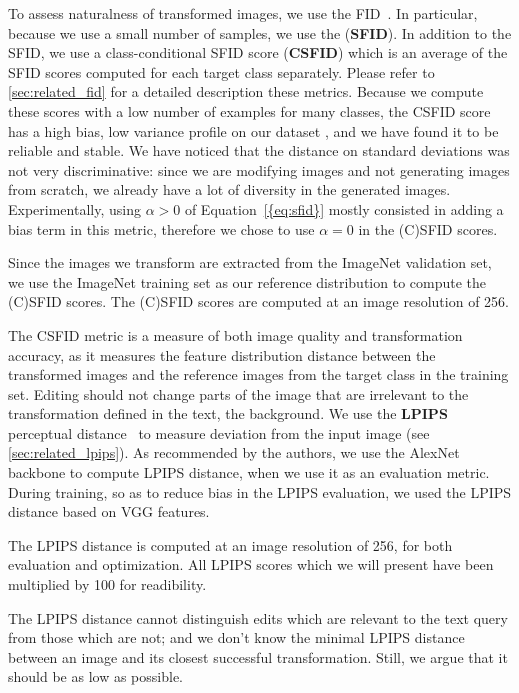 To assess naturalness of  transformed images, we use the \ac{FID}~\citep{heusel2017gans}.
In particular, because we use a small number of samples, we use the (\textbf{\ac{SFID}}).
In addition to the \ac{SFID}, we use a class-conditional
 SFID score  (\textbf{CSFID}) which is an average of the \ac{SFID} scores computed for each 
 target class separately.
  Please refer to \ref{sec:related_fid} for a detailed description these metrics. 
 Because we compute these scores with a low number of examples 
  for many classes, the \ac{CSFID} score has a high bias, low variance profile on our
   dataset \citep{chong2020effectively}, and we  
 have found it to be reliable and stable. We have noticed that the distance on standard deviations was not very discriminative: 
 since we are modifying images and not generating images from scratch, we already have
  a lot of diversity in the generated images. 
  Experimentally, using $\alpha > 0$ of Equation~\ref{{eq:sfid}} mostly consisted in
   adding a bias term in this metric, therefore we chose to use $\alpha =0 $ in the (C)SFID scores. 

Since the images we transform are extracted from the ImageNet validation set, we use the ImageNet training set as our 
reference distribution to compute the (C)SFID scores. 
The (C)SFID scores are computed at an image resolution of 256.



The \ac{CSFID} metric is a measure of both image quality and transformation accuracy, as it 
measures the feature distribution distance between the transformed images and the 
reference images from the target class in the %
training set. 
Editing should not change parts of the image that are irrelevant to the transformation
 defined in the text,  \eg the background.  
We use the \textbf{LPIPS} perceptual distance~\citep{zhanglpips2018}  to measure deviation 
from the input image (see \ref{sec:related_lpips}). 
As recommended by the authors, we use the AlexNet~\cite{krizhevsky12nips} backbone to 
compute \ac{LPIPS} distance, when we use it as
an evaluation metric. During training, so as to reduce bias in the \ac{LPIPS} evaluation, we used the 
\ac{LPIPS} distance based on VGG features.

The \ac{LPIPS}  distance is computed at an image resolution of 256, for both evaluation and 
optimization.
All \ac{LPIPS}  scores which we will present have been multiplied by 100 for readibility.

The \ac{LPIPS}  distance cannot distinguish edits which are relevant to the text 
query from those which are not; and we don't know the minimal \ac{LPIPS} distance between 
an image and its closest successful transformation. Still, we argue that it should be 
as low as possible.


